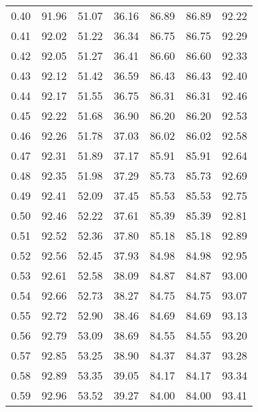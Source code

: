 \begin{tabular}{|c|c|c|c|c|c|c|}
      0.40 &     91.96 &     51.07 &      36.16 &   86.89 &      86.89 &         92.22 \\
      0.41 &     92.02 &     51.22 &      36.34 &   86.75 &      86.75 &         92.29 \\
      0.42 &     92.05 &     51.27 &      36.41 &   86.60 &      86.60 &         92.33 \\
      0.43 &     92.12 &     51.42 &      36.59 &   86.43 &      86.43 &         92.40 \\
      0.44 &     92.17 &     51.55 &      36.75 &   86.31 &      86.31 &         92.46 \\
      0.45 &     92.22 &     51.68 &      36.90 &   86.20 &      86.20 &         92.53 \\
      0.46 &     92.26 &     51.78 &      37.03 &   86.02 &      86.02 &         92.58 \\
      0.47 &     92.31 &     51.89 &      37.17 &   85.91 &      85.91 &         92.64 \\
      0.48 &     92.35 &     51.98 &      37.29 &   85.73 &      85.73 &         92.69 \\
      0.49 &     92.41 &     52.09 &      37.45 &   85.53 &      85.53 &         92.75 \\
      0.50 &     92.46 &     52.22 &      37.61 &   85.39 &      85.39 &         92.81 \\
      0.51 &     92.52 &     52.36 &      37.80 &   85.18 &      85.18 &         92.89 \\
      0.52 &     92.56 &     52.45 &      37.93 &   84.98 &      84.98 &         92.95 \\
      0.53 &     92.61 &     52.58 &      38.09 &   84.87 &      84.87 &         93.00 \\
      0.54 &     92.66 &     52.73 &      38.27 &   84.75 &      84.75 &         93.07 \\
      0.55 &     92.72 &     52.90 &      38.46 &   84.69 &      84.69 &         93.13 \\
      0.56 &     92.79 &     53.09 &      38.69 &   84.55 &      84.55 &         93.20 \\
      0.57 &     92.85 &     53.25 &      38.90 &   84.37 &      84.37 &         93.28 \\
      0.58 &     92.89 &     53.35 &      39.05 &   84.17 &      84.17 &         93.34 \\
      0.59 &     92.96 &     53.52 &      39.27 &   84.00 &      84.00 &         93.41 \\

\end{tabular}
